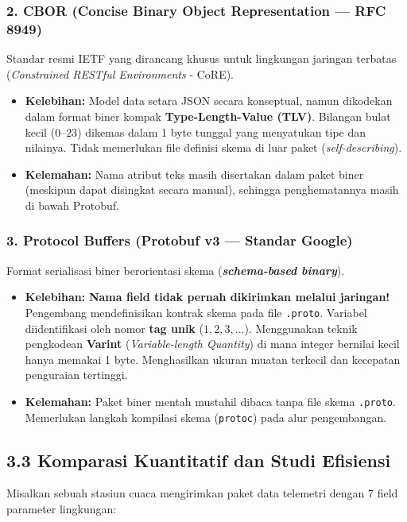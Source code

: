 \documentclass[11pt,a4paper]{article}
\begin{document}
\subsubsection*{2. CBOR (Concise Binary Object Representation --- RFC 8949)}
Standar resmi IETF yang dirancang khusus untuk lingkungan jaringan terbatas (\textit{Constrained RESTful Environments} - CoRE).
\begin{itemize}
    \item \textbf{Kelebihan:} Model data setara JSON secara konseptual, namun dikodekan dalam format biner kompak \textbf{Type-Length-Value (TLV)}. Bilangan bulat kecil ($0\text{--}23$) dikemas dalam 1 byte tunggal yang menyatukan tipe dan nilainya. Tidak memerlukan file definisi skema di luar paket (\textit{self-describing}).
    \item \textbf{Kelemahan:} Nama atribut teks masih disertakan dalam paket biner (meskipun dapat disingkat secara manual), sehingga penghematannya masih di bawah Protobuf.
\end{itemize}

\subsubsection*{3. Protocol Buffers (Protobuf v3 --- Standar Google)}
Format serialisasi biner berorientasi skema (\textbf{\textit{schema-based binary}}).
\begin{itemize}
    \item \textbf{Kelebihan:} \textbf{Nama field tidak pernah dikirimkan melalui jaringan!} Pengembang mendefinisikan kontrak skema pada file \texttt{.proto}. Variabel diidentifikasi oleh nomor \textbf{tag unik} ($1, 2, 3,\dots$). Menggunakan teknik pengkodean \textbf{Varint} (\textit{Variable-length Quantity}) di mana integer bernilai kecil hanya memakai 1 byte. Menghasilkan ukuran muatan terkecil dan kecepatan penguraian tertinggi.
    \item \textbf{Kelemahan:} Paket biner mentah mustahil dibaca tanpa file skema \texttt{.proto}. Memerlukan langkah kompilasi skema (\texttt{protoc}) pada alur pengembangan.
\end{itemize}

\subsection*{3.3 Komparasi Kuantitatif dan Studi Efisiensi}
Misalkan sebuah stasiun cuaca mengirimkan paket data telemetri dengan 7 field parameter lingkungan:
\end{document}
